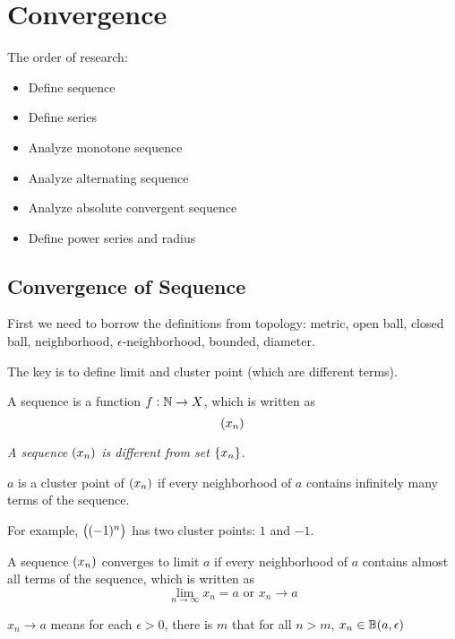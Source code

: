 \chapter{Convergence}

The order of research:
\begin{itemize}
    \item Define sequence    
    \item Define series
    \item Analyze monotone sequence
    \item Analyze alternating sequence
    \item Analyze absolute convergent sequence
    \item Define power series and radius
\end{itemize}

%
%
%
%

\section{Convergence of Sequence}

First we need to borrow the definitions from topology: metric, open ball, closed ball, neighborhood, $\epsilon$-neighborhood, bounded, diameter.

The key is to define limit and cluster point (which are different terms).

\begin{definition}
    A sequence is a function $f: \mathbb{N} \rightarrow X$, which is written as
    \begin{equation}
        \sequence{x_n}
    \end{equation}
    
    \emph{A sequence $\sequence{x_n}$ is different from set $\set{x_n}$}.
\end{definition}

\begin{definition}
    $a$ is a cluster point of $\sequence{x_n}$ if every neighborhood of $a$ contains infinitely many terms of the sequence.
    
    For example, $\sequence{(-1)^n}$ has two cluster points: $1$ and $-1$.
\end{definition}

\begin{definition}
    A sequence $\sequence{x_n}$ converges to limit $a$ if every neighborhood of $a$ contains almost all terms of the sequence, which is written as
    \begin{equation}
        \lim_{n \rightarrow \infty} x_n = a \text{ or } x_n \rightarrow a
    \end{equation}
    
    $x_n \rightarrow a$ means for each $\epsilon>0$, there is $m$ that for all $n > m$, $x_n \in \mathbb{B}(a, \epsilon)$
\end{definition}

